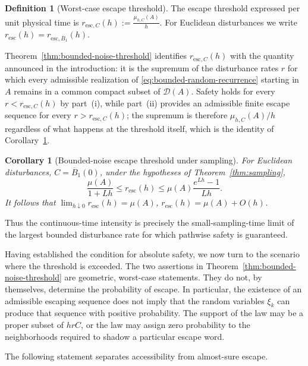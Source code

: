 \documentclass[pdflatex,sn-mathphys-num]{sn-jnl}
\numberwithin{equation}{section}
\theoremstyle{thmstyleone}%
\newtheorem{corollary}[theorem]{Corollary}
\theoremstyle{definition}
\newtheorem{definition}[theorem]{Definition}
\theoremstyle{remark}
\begin{document}
\begin{definition}[Worst-case escape threshold]
\label{def:escape-threshold}
The escape threshold expressed per unit physical time is $r_{\mathrm{esc},C}(h) := \frac{\mu_{h,C}(A)}{h}$. For Euclidean disturbances we write $r_{\mathrm{esc}}(h)=r_{\mathrm{esc},\overline B_1}(h)$.
\end{definition}

Theorem~\ref{thm:bounded-noise-threshold} identifies $r_{\mathrm{esc},C}(h)$ with the quantity announced in the
introduction: it is the supremum of the disturbance rates $r$ for which every admissible realization of
\eqref{eq:bounded-random-recurrence} starting in $A$ remains in a common compact subset of $\mathcal D(A)$. Safety holds for every $r<r_{\mathrm{esc},C}(h)$ by part~(i), while part~(ii) provides an admissible finite escape sequence for every $r>r_{\mathrm{esc},C}(h)$; the supremum is therefore $\mu_{h,C}(A)/h$ regardless of what happens at the threshold itself, which is the identity of Corollary~\ref{cor:bounded-noise}.

\begin{corollary}[Bounded-noise escape threshold under sampling]
\label{cor:bounded-noise}
For Euclidean disturbances, $C=\overline B_1(0)$, under the hypotheses of Theorem~\ref{thm:sampling},
$$
    \frac{\mu(A)}{1+Lh}
    \leq
    r_{\mathrm{esc}}(h)
    \leq
    \mu(A)\frac{e^{Lh}-1}{Lh}.
$$
It follows that $\lim_{h\downarrow0}r_{\mathrm{esc}}(h)=\mu(A)$, $r_{\mathrm{esc}}(h)=\mu(A)+O(h)$.
\end{corollary}

Thus the continuous-time intensity is precisely the small-sampling-time limit of the largest bounded disturbance rate for which pathwise safety is guaranteed.

Having established the condition for absolute safety, we now turn to the scenario where the threshold is exceeded. The two assertions in Theorem~\ref{thm:bounded-noise-threshold} are geometric, worst-case statements. They do not, by themselves, determine the probability of escape. In particular, the existence of an admissible escaping sequence does not imply that the random variables $\xi_k$ can produce that sequence with positive probability. The support of the law may be a proper subset of $hrC$, or the law may assign zero probability to the neighborhoods required to shadow a particular escape word.

The following statement separates accessibility from almost-sure escape.
\end{document}
